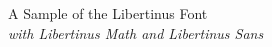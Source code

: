 \documentclass[11pt]{article}
\begin{document}
{\dispfont\LARGE \noindent A Sample of the Libertinus Font}\\

{\large \noindent \textit{with Libertinus Math and Libertinus Sans}}\\[5pt]


\end{document}
